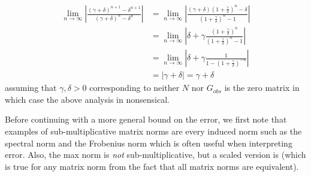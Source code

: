 \documentclass[../Thesis.tex]{subfiles}
\begin{document}
\begin{align*}
    \lim_{n\to \infty} \left|\frac{ \left(\gamma + \delta\right)^{n+1} - \delta^{n+1}}{\left(\gamma + \delta\right)^n - \delta^n}\right| & = \lim_{n\to \infty}\left|\frac{ \left(\gamma + \delta\right) \left(1 + \frac{\gamma}{\delta}\right)^n - \delta}{\left(1 + \frac{\gamma}{\delta} \right)^n - 1}\right| \\
                                                                                                                                         & = \lim_{n\to \infty}\left|\delta + \gamma \frac{\left(1 + \frac{\gamma}{\delta} \right)^n}{\left(1 + \frac{\gamma}{\delta} \right)^n - 1}\right|                       \\
                                                                                                                                         & = \lim_{n\to \infty} \left|\delta + \gamma \frac{1}{1 - \left( 1 + \frac{\gamma}{\delta} \right) ^{-n}}\right|                                                         \\
                                                                                                                                         & = \left| \gamma + \delta \right| = \gamma + \delta
\end{align*}
assuming that $\gamma, \delta > 0$ corresponding to neither $N$ nor $G_{obs}$ is the zero matrix in which case the above analysis in nonsensical.

Before continuing with a more general bound on the error, we first note that examples of sub-multiplicative matrix norms are every induced norm such as the spectral norm and the Frobenius norm which is often useful when interpreting error. Also, the max norm is \textit{not} sub-multiplicative, but a scaled version is (which is true for any matrix norm from the fact that all matrix norms are equivalent).

\end{document}

